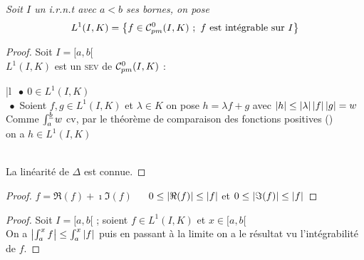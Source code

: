 	\emph{Soit $I$ un i.r.n.t avec $a<b$ ses bornes, on pose}
	\[
		L^1(I,K) = \big\{f\in{\mathcal{C}_{pm}^0}(I,K) ~;~f \text{ est intégrable sur } I \big\}
	\]
	
	
	\begin{proof} Soit $I=[a,b[$ \vspace*{0.2cm}\\
		$L^1(I,K)$ est un \textsc{sev} de ${\mathcal{C}_{pm}^0}(I,K)$ : \\ 
		\hspace*{0.5cm}\begin{blockarray}{|l}
			$~\bullet ~0\in L^1(I,K)$ \\ 
			$~\bullet$ Soient $f,g\in L^1(I,K)$ et $\lambda\in K$ on pose $h=\lambda f+g$ avec $\left\vert h \right\vert\leq \left\vert \lambda \right\vert\left\vert f \right\vert\left\vert g \right\vert = w$ \\ 
			Comme $\int_a^{\uline{b}} w$ cv, par le théorème de comparaison des fonctions positives () \\
			on a $h\in L^1(I,K)$  
		\end{blockarray}\\
		La linéarité de $\Delta$ est connue.
	\end{proof} \medskip
	
	
	\begin{proof}
		\fbox{$\Leftarrow$} $f=\Re(f)+\imath \Im(f)$ $~~~~$ \fbox{$\Rightarrow$} $0\leq\left\vert \Re(f) \right\vert \leq \left\vert f \right\vert$ et $0\leq\left\vert \Im(f) \right\vert\leq\left\vert f \right\vert$
	\end{proof} \medskip
	
	
	
	\begin{proof}
		Soit $I=[a,b[$ ; soient $f\in L^1(I,K)$ et $x\in [a,b[$\\
		On a $\left\vert \int_a^x f \right\vert \leq \int_a^x \left\vert f \right\vert$ puis en passant à la limite on a le résultat vu l'intégrabilité de $f$.
	\end{proof} \medskip
	
